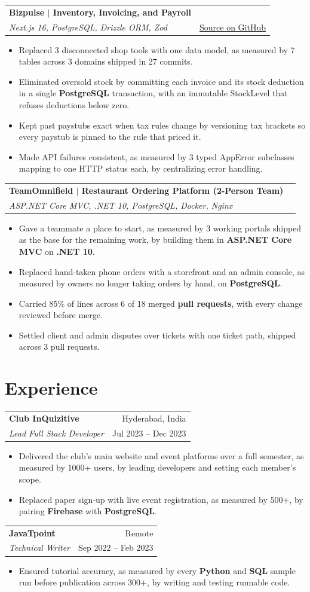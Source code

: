\documentclass[letterpaper,10pt]{article}
\makeatletter
\newcommand{\bi}[1]{\item{\small #1}}
\newcommand{\row}[4]{\begin{tabular*}{\textwidth}[t]{l@{\extracolsep{\fill}}r}
\textbf{#1} & \small #2 \\ \textit{\small #3} & \small #4 \\ \end{tabular*}\vspace{0pt}}
\newcommand{\bstart}{\begin{itemize}[leftmargin=0.16in,itemsep=0.8pt,parsep=0pt,topsep=1pt,label=\textbullet]}
\newcommand{\bend}{\end{itemize}\vspace{1pt}}
\makeatother
\begin{document}
\row{Bizpulse $|$ Inventory, Invoicing, and Payroll}{}{Next.js 16, PostgreSQL, Drizzle ORM, Zod}{\href{https://github.com/HarshaVardhanRobba/Bizpulse}{\underline{Source on GitHub}}}
\bstart
\bi{Replaced 3 disconnected shop tools with one data model, as measured by 7 tables across 3 domains shipped in 27 commits.}
\bi{Eliminated oversold stock by committing each invoice and its stock deduction in a single \textbf{PostgreSQL} transaction, with an immutable StockLevel that refuses deductions below zero.}
\bi{Kept past paystubs exact when tax rules change by versioning tax brackets so every paystub is pinned to the rule that priced it.}
\bi{Made API failures consistent, as measured by 3 typed AppError subclasses mapping to one HTTP status each, by centralizing error handling.}
\bend

\row{TeamOmnifield $|$ Restaurant Ordering Platform (2-Person Team)}{}{ASP.NET Core MVC, .NET 10, PostgreSQL, Docker, Nginx}{}
\bstart
\bi{Gave a teammate a place to start, as measured by 3 working portals shipped as the base for the remaining work, by building them in \textbf{ASP.NET Core MVC} on \textbf{.NET 10}.}
\bi{Replaced hand-taken phone orders with a storefront and an admin console, as measured by owners no longer taking orders by hand, on \textbf{PostgreSQL}.}
\bi{Carried 85\% of lines across 6 of 18 merged \textbf{pull requests}, with every change reviewed before merge.}
\bi{Settled client and admin disputes over tickets with one ticket path, shipped across 3 pull requests.}
\bend

\section{Experience}
\row{Club InQuizitive}{Hyderabad, India}{Lead Full Stack Developer}{Jul 2023 -- Dec 2023}
\bstart
\bi{Delivered the club's main website and event platforms over a full semester, as measured by 1000+ users, by leading developers and setting each member's scope.}
\bi{Replaced paper sign-up with live event registration, as measured by 500+, by pairing \textbf{Firebase} with \textbf{PostgreSQL}.}
\bend
\row{JavaTpoint}{Remote}{Technical Writer}{Sep 2022 -- Feb 2023}
\bstart
\bi{Ensured tutorial accuracy, as measured by every \textbf{Python} and \textbf{SQL} sample run before publication across 300+, by writing and testing runnable code.}
\bend
\end{document}
